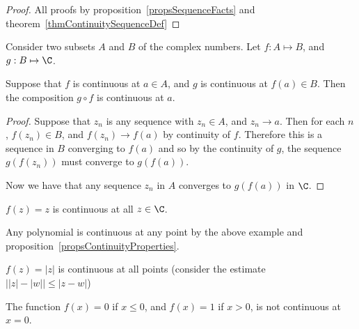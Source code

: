 \documentclass[../Main.tex]{subfiles}
\begin{document}
\begin{proof}
    All proofs by proposition~\ref{propsSequenceFacts} and theorem~\ref{thmContinuitySequenceDef}
\end{proof}
\begin{theorem}
    Consider two subsets $A$ and $B$ of the complex numbers. Let $f : A \mapsto B$, and $g : B \mapsto \C$.\par
    Suppose that $f$ is continuous at $a \in A$, and $g$ is continuous at $f(a) \in B$. Then the composition $g \circ f$ is continuous at $a$.
    \label{thmCompositionContinuous}
\end{theorem}
\begin{proof}
    Suppose that $z_n$ is any sequence with $z_n \in A$, and $z_n \to a$. Then for each $n$, $f(z_n) \in B$, and $f(z_n) \to f(a)$ by continuity of $f$. Therefore this is a sequence in $B$ converging to $f(a)$ and so by the continuity of $g$, the sequence $g(f(z_n))$ must converge to $g(f(a))$.\par
    Now we have that any sequence $z_n$ in $A$ converges to $g(f(a))$ in $\C$.
\end{proof}
\begin{examples}{}
    \item $f(z) = z$ is continuous at all $z \in \C$.
    \item Any polynomial is continuous at any point by the above example and proposition~\ref{propsContinuityProperties}.
    \item $f(z) = |z|$ is continuous at all points (consider the estimate \\ $\big ||z| - |w|\big | \leq |z - w|$)
    \item The function $f(x) = 0$ if $x \leq 0$, and $f(x) = 1$ if $x > 0$, is not continuous at $x = 0$.
\end{examples}
\end{document}
